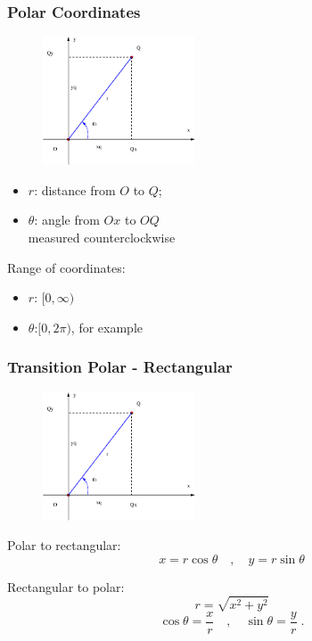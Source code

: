 \begin{frame}
 \frametitle{Polar Coordinates}
%
\begin{figure}[h]
  \includegraphics[height=1.5in]{../images/polar_coordinates.eps}
\end{figure}
%
\begin{itemize}
 \item $r$: distance from $O$ to $Q$;

  \item $\theta$: angle from $Ox$ to $OQ$\\
    measured counterclockwise
\end{itemize}

\pause
Range of coordinates:
\begin{itemize}
 \item $r$: \pause $[0, \infty)$
  \item $\theta$:\pause $[0, 2\pi)$, for example
\end{itemize}

\end{frame}


\begin{frame}
 \frametitle{Transition Polar - Rectangular}
%
\begin{figure}[h]
  \includegraphics[height=1.5in]{../images/polar_coordinates.eps}
\end{figure}
%
Polar to rectangular:\pause
$$ x = r \cos\theta \quad , \quad y = r\sin\theta$$

Rectangular to polar:\pause
$$ r = \sqrt{x^2+y^2}$$
$$\cos\theta = \frac{x}{r} \quad , \quad \sin\theta = \frac{y}{r}\; .$$

\end{frame}

